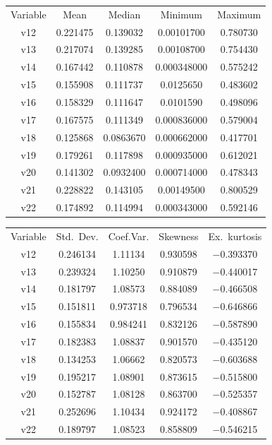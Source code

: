 \documentclass[11pt]{article}
\begin{document}
\begin{appendices}
\begin{table}[H]
\begin{center}
	\vspace{2em}

	\begin{tabular}{|c|c|c|c|c|}
		Variable & {Mean}& {Median}  & {Minimum}    & {Maximum} \\[1ex]
		v12 & 0.221475 & 0.139032 & 0.00101700 & 0.780730\\
		v13 & 0.217074 & 0.139285 & 0.00108700 & 0.754430\\
		v14 & 0.167442 & 0.110878 & 0.000348000 & 0.575242\\
		v15 & 0.155908 & 0.111737 & 0.0125650 & 0.483602\\
		v16 & 0.158329 & 0.111647 & 0.0101590 & 0.498096\\
		v17 & 0.167575 & 0.111349 & 0.000836000 & 0.579004\\
		v18 & 0.125868 & 0.0863670 & 0.000662000 & 0.417701\\
		v19 & 0.179261 & 0.117898 & 0.000935000 & 0.612021\\
		v20 & 0.141302 & 0.0932400 & 0.000714000 & 0.478343\\
		v21 & 0.228822 & 0.143105 & 0.00149500 & 0.800529\\
		v22 & 0.174892 & 0.114994 & 0.000343000 & 0.592146\\ \hline\hline
	\end{tabular}
	\begin{tabular}{|c|c|c|c|c|}
		\rowcolors{1}{Lavender}{MintCream}
		Variable &  {Std.\ Dev.}  & {Coef.Var.}   & {Skewness}    & {Ex.\ kurtosis} \\[1ex]
		v12 & 0.246134 & 1.11134 & 0.930598 & $-$0.393370\\
		v13 & 0.239324 & 1.10250 & 0.910879 & $-$0.440017\\
		v14 & 0.181797 & 1.08573 & 0.884089 & $-$0.466508\\
		v15 & 0.151811 & 0.973718 & 0.796534 & $-$0.646866\\
		v16 & 0.155834 & 0.984241 & 0.832126 & $-$0.587890\\
		v17 & 0.182383 & 1.08837 & 0.901570 & $-$0.435120\\
		v18 & 0.134253 & 1.06662 & 0.820573 & $-$0.603688\\
		v19 & 0.195217 & 1.08901 & 0.873615 & $-$0.515800\\
		v20 & 0.152787 & 1.08128 & 0.863700 & $-$0.525357\\
		v21 & 0.252696 & 1.10434 & 0.924172 & $-$0.408867\\
		v22 & 0.189797 & 1.08523 & 0.858809 & $-$0.546215\\
	\end{tabular}
	\end{center}
	

\end{table}
\end{appendices}
\end{document}
